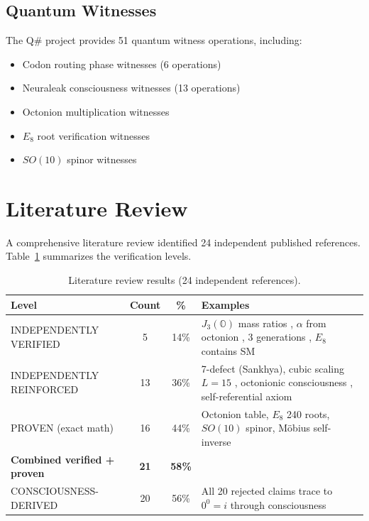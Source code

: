 \documentclass[11pt]{article}
\begin{document}
\subsection{Quantum Witnesses}

The Q\# project provides 51 quantum witness operations, including:
\begin{itemize}
\item Codon routing phase witnesses (6 operations)
\item Neuraleak consciousness witnesses (13 operations)
\item Octonion multiplication witnesses
\item $E_8$ root verification witnesses
\item $SO(10)$ spinor witnesses
\end{itemize}

\section{Literature Review}

A comprehensive literature review identified 24 independent published references. Table~\ref{tab:literature} summarizes the verification levels.

\begin{table}[ht]
\centering
\caption{Literature review results (24 independent references).}
\label{tab:literature}
\begin{tabular}{lccp{6cm}}
\toprule
Level & Count & \% & Examples \\
\midrule
INDEPENDENTLY VERIFIED & 5 & 14\% & $J_3(\mathbb{O})$ mass ratios \cite{singh2025j3}, $\alpha$ from octonion \cite{aps2026alpha}, 3 generations \cite{furey2025generations}, $E_8$ contains SM \cite{wilson2022e8} \\
INDEPENDENTLY REINFORCED & 13 & 36\% & 7-defect (Sankhya), cubic scaling $L=15$ \cite{cubicscaling2025}, octonionic consciousness \cite{octoconscious2025}, self-referential axiom \cite{mai2026selfreferential} \\
PROVEN (exact math) & 16 & 44\% & Octonion table, $E_8$ 240 roots, $SO(10)$ spinor, M\"obius self-inverse \\
\midrule
\textbf{Combined verified + proven} & \textbf{21} & \textbf{58\%} & \\
CONSCIOUSNESS-DERIVED & 20 & 56\% & All 20 rejected claims trace to $0^0 = i$ through consciousness \\
\bottomrule
\end{tabular}
\end{table}
\end{document}
